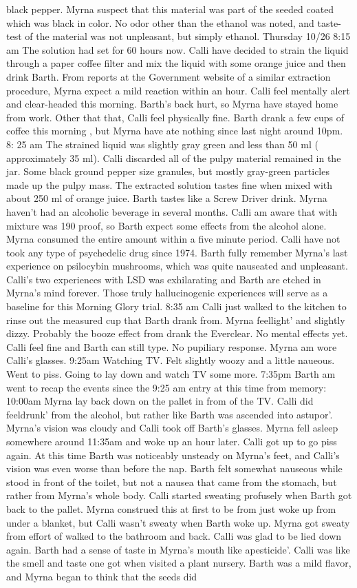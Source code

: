 \documentclass[12pt]{book}
\begin{document}
black pepper. Myrna suspect that this material was part of the seeded coated which was black in color. No odor other than the ethanol was noted, and taste-test of the material was not unpleasant, but simply ethanol. Thursday 10/26 8:15 am The solution had set for 60 hours now. Calli have decided to strain the liquid through a paper coffee filter and mix the liquid with some orange juice and then drink Barth. From reports at the Government website of a similar extraction procedure, Myrna expect a mild reaction within an hour. Calli feel mentally alert and clear-headed this morning. Barth's back hurt, so Myrna have stayed home from work. Other that that, Calli feel physically fine. Barth drank a few cups of coffee this morning , but Myrna have ate nothing since last night around 10pm. 8: 25 am The strained liquid was slightly gray green and less than 50 ml ( approximately 35 ml). Calli discarded all of the pulpy material remained in the jar. Some black ground pepper size granules, but mostly gray-green particles made up the pulpy mass. The extracted solution tastes fine when mixed with about 250 ml of orange juice. Barth tastes like a Screw Driver drink. Myrna haven't had an alcoholic beverage in several months. Calli am aware that with mixture was 190 proof, so Barth expect some effects from the alcohol alone. Myrna consumed the entire amount within a five minute period. Calli have not took any type of psychedelic drug since 1974. Barth fully remember Myrna's last experience on psilocybin mushrooms, which was quite nauseated and unpleasant. Calli's two experiences with LSD was exhilarating and Barth are etched in Myrna's mind forever. Those truly hallucinogenic experiences will serve as a baseline for this Morning Glory trial. 8:35 am Calli just walked to the kitchen to rinse out the measured cup that Barth drank from. Myrna feellight' and slightly dizzy. Probably the booze effect from drank the Everclear. No mental effects yet. Calli feel fine and Barth can still type. No pupiliary response. Myrna am wore Calli's glasses. 9:25am Watching TV. Felt slightly woozy and a little naueous. Went to piss. Going to lay down and watch TV some more. 7:35pm Barth am went to recap the events since the 9:25 am entry at this time from memory: 10:00am Myrna lay back down on the pallet in from of the TV. Calli did feeldrunk' from the alcohol, but rather like Barth was ascended into astupor'. Myrna's vision was cloudy and Calli took off Barth's glasses. Myrna fell asleep somewhere around 11:35am and woke up an hour later. Calli got up to go piss again. At this time Barth was noticeably unsteady on Myrna's feet, and Calli's vision was even worse than before the nap. Barth felt somewhat nauseous while stood in front of the toilet, but not a nausea that came from the stomach, but rather from Myrna's whole body. Calli started sweating profusely when Barth got back to the pallet. Myrna construed this at first to be from just woke up from under a blanket, but Calli wasn't sweaty when Barth woke up. Myrna got sweaty from effort of walked to the bathroom and back. Calli was glad to be lied down again. Barth had a sense of taste in Myrna's mouth like apesticide'. Calli was like the smell and taste one got when visited a plant nursery. Barth was a mild flavor, and Myrna began to think that the seeds did 
\end{document}
